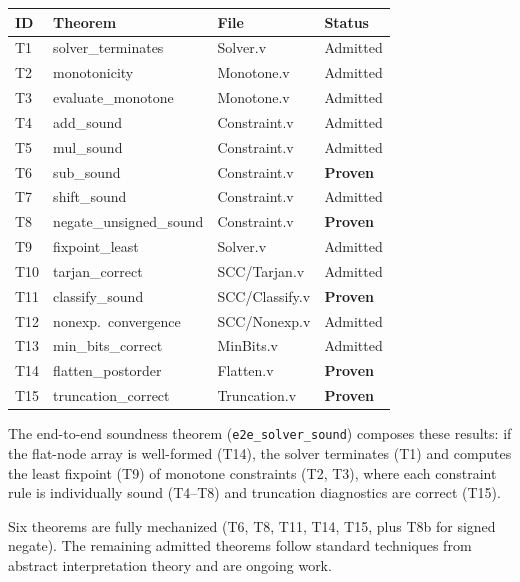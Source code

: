 \documentclass[conference]{IEEEtran}
\begin{document}
\begin{center}
\footnotesize
\begin{tabular}{@{}llll@{}}
\toprule
\textbf{ID} & \textbf{Theorem} & \textbf{File} & \textbf{Status} \\
\midrule
T1  & solver\_terminates       & Solver.v      & Admitted \\
T2  & monotonicity             & Monotone.v    & Admitted \\
T3  & evaluate\_monotone       & Monotone.v    & Admitted \\
T4  & add\_sound               & Constraint.v  & Admitted \\
T5  & mul\_sound               & Constraint.v  & Admitted \\
T6  & sub\_sound               & Constraint.v  & \textbf{Proven} \\
T7  & shift\_sound             & Constraint.v  & Admitted \\
T8  & negate\_unsigned\_sound  & Constraint.v  & \textbf{Proven} \\
T9  & fixpoint\_least          & Solver.v      & Admitted \\
T10 & tarjan\_correct          & SCC/Tarjan.v  & Admitted \\
T11 & classify\_sound          & SCC/Classify.v & \textbf{Proven} \\
T12 & nonexp.\ convergence    & SCC/Nonexp.v  & Admitted \\
T13 & min\_bits\_correct       & MinBits.v     & Admitted \\
T14 & flatten\_postorder       & Flatten.v     & \textbf{Proven} \\
T15 & truncation\_correct      & Truncation.v  & \textbf{Proven} \\
\bottomrule
\end{tabular}
\end{center}

The end-to-end soundness theorem (\texttt{e2e\_solver\_sound}) composes
these results: if the flat-node array is well-formed (T14), the solver
terminates (T1) and computes the least fixpoint (T9) of monotone
constraints (T2, T3), where each constraint rule is individually sound
(T4--T8) and truncation diagnostics are correct (T15).

Six theorems are fully mechanized (T6, T8, T11, T14, T15, plus T8b for
signed negate).  The remaining admitted theorems follow standard
techniques from abstract interpretation theory and are ongoing work.

\end{document}
